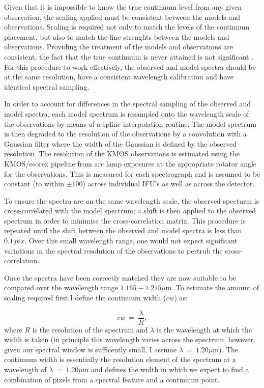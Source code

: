 \documentclass[12pt]{article}
\begin{document}
Given that it is impossible to know the true continuum level from any given observation,
the scaling applied must be consistent between the models and observations.
Scaling is required not only to match the levels of the continnum placement, but also to match the line strenghts between the models and observations.
Providing the treatment of the models and observations are consistent, the fact that the true continuum is never attained is not significant
\citep{2014ApJ...788...58G}.
For this procedure to work effectively,
the observed and model spectra should be at the same resolution,
have a consistent wavelength calibration
and have identical spectral sampling.

In order to account for differences in the spectral sampling of the observed and model spectra,
each model spectrum is resampled onto the wavelength scale of the observations by means of a spline interpolation routine.
The model spectrum is then degraded to the resolution of the observations by a
convolution with a Gaussian filter where the width of the Gaussian is defined by the observed resolution.
The resolution of the KMOS observations is estimated using the KMOS/esorex pipeline from arc lamp exposures at the appropriate rotator angle for the observations.
This is measured for each spectrograph and is assumed to be constant (to within $\pm 100$) across individual IFU's as well as across the detector.

To ensure the spectra are on the same wavelength scale, the observed specturm is cross-correlated with the model spectrum;
a shift is then applied to the observed spectrum in order to minimise the cross-correlation matrix.
This procedure is repeated until the shift between the observed and model spectra is less than $0.1\,pix$.
Over this small wavelength range, one would not expect significant variations in the spectral resolution of the observations to pertrub the cross-correlation.

Once the spectra have been correctly matched they are now suitable to be compared over the wavelength range $1.165-1.215\mu$m.
To estimate the amount of scaling required first I define the continuum width ($cw$) as:

\begin{equation}
    cw~=~\frac{\lambda}{R}, %
\end{equation}
\noindent where $R$ is the resolution of the spectrum and
$\lambda$ is the wavelength at which the width is taken
(in principle this wavelength varies across the spectrum, however, given our spectral window is sufficently small, I assume $\lambda~=~1.20\mu$m).
The continuum width is essentially the resolution element of the spectrum at a wavelength of
$\lambda~=~1.20\mu$m and defines the width in which we expect to find a combination of pixels from a spectral feature and a continuum point.
\end{document}
